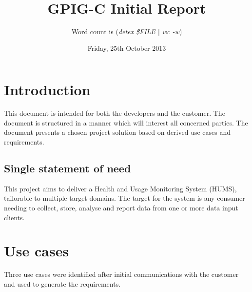 \documentclass[10pt,a4paper]{article}
\begin{document}
\title{\vspace{-1cm}GPIG-C Initial Report}
\author{Word count is  (\textit{detex \$FILE $\vert$ wc -w})}
\date{Friday, 25th October 2013}
\maketitle
\thispagestyle{fancy} %


\section{Introduction} %
This document is intended for both the developers and the customer.
The document is structured in a manner which will interest all concerned
parties. The document presents a chosen project solution based on derived 
 use cases and requirements.
 
\subsection{Single statement of need} %
This project aims to deliver a Health and Usage Monitoring System
(HUMS), tailorable to multiple target domains. The target for the system is any
consumer needing to collect, store, analyse and report data from one or more
data input clients.

\section{Use cases} %
Three use cases were identified after initial communications with the customer and used to generate the requirements. 
\end{document}
